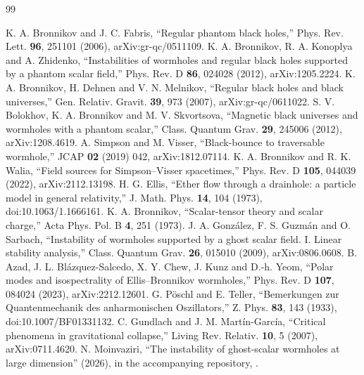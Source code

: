 \documentclass[11pt]{article}
\theoremstyle{plain}
\begin{document}
\begin{thebibliography}{99}

 K. A. Bronnikov and J. C. Fabris, ``Regular phantom black holes,'' Phys. Rev. Lett. \textbf{96}, 251101
(2006), arXiv:gr-qc/0511109.
 K. A. Bronnikov, R. A. Konoplya and A. Zhidenko, ``Instabilities of wormholes and regular black holes
supported by a phantom scalar field,'' Phys. Rev. D \textbf{86}, 024028 (2012), arXiv:1205.2224.
 K. A. Bronnikov, H. Dehnen and V. N. Melnikov, ``Regular black holes and black universes,'' Gen. Relativ.
Gravit. \textbf{39}, 973 (2007), arXiv:gr-qc/0611022.
 S. V. Bolokhov, K. A. Bronnikov and M. V. Skvortsova, ``Magnetic black universes and wormholes with a
phantom scalar,'' Class. Quantum Grav. \textbf{29}, 245006 (2012), arXiv:1208.4619.
 A. Simpson and M. Visser, ``Black-bounce to traversable wormhole,'' JCAP \textbf{02} (2019) 042,
arXiv:1812.07114.
 K. A. Bronnikov and R. K. Walia, ``Field sources for Simpson--Visser spacetimes,'' Phys. Rev. D
\textbf{105}, 044039 (2022), arXiv:2112.13198.
 H. G. Ellis, ``Ether flow through a drainhole: a particle model in general relativity,'' J. Math.
Phys. \textbf{14}, 104 (1973), doi:10.1063/1.1666161.
 K. A. Bronnikov, ``Scalar-tensor theory and scalar charge,'' Acta Phys. Pol. B \textbf{4}, 251
(1973).
 J. A. González, F. S. Guzmán and O. Sarbach, ``Instability of wormholes supported by a ghost scalar
field. I. Linear stability analysis,'' Class. Quantum Grav. \textbf{26}, 015010 (2009), arXiv:0806.0608.
 B. Azad, J. L. Blázquez-Salcedo, X. Y. Chew, J. Kunz and D.-h. Yeom, ``Polar modes and isospectrality of
Ellis--Bronnikov wormholes,'' Phys. Rev. D \textbf{107}, 084024 (2023), arXiv:2212.12601.
 G. Pöschl and E. Teller, ``Bemerkungen zur Quantenmechanik des anharmonischen Oszillators,'' Z. Phys.
\textbf{83}, 143 (1933), doi:10.1007/BF01331132.
 C. Gundlach and J. M. Martín-García, ``Critical phenomena in gravitational collapse,'' Living Rev.
Relativ. \textbf{10}, 5 (2007), arXiv:0711.4620.
 N. Moinvaziri, ``The instability of ghost-scalar wormholes at large dimension'' (2026), in the
accompanying repository, .


\end{thebibliography}
\end{document}
